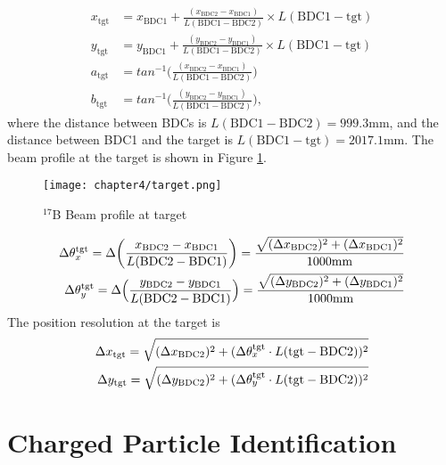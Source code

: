 \begin{align}
    x_{\text{tgt}} &= x_{\text{BDC1}} + \frac{(x_{\text{BDC2}} - x_{\text{BDC1}})}{L(\text{BDC1} - \text{BDC2})} \times L(\text{BDC1} - \text{tgt})\\
    y_{\text{tgt}} &= y_{\text{BDC1}} + \frac{(y_{\text{BDC2}} - y_{\text{BDC1}})}{L(\text{BDC1} - \text{BDC2})} \times L(\text{BDC1} - \text{tgt})\\
    a_{\text{tgt}} &= tan^{-1} \bigg( \frac{(x_{\text{BDC2}} - x_{\text{BDC1}})}{L(\text{BDC1} - \text{BDC2})} \bigg)\\
    b_{\text{tgt}} &= tan^{-1} \bigg( \frac{(y_{\text{BDC2}} - y_{\text{BDC1}})}{L(\text{BDC1} - \text{BDC2})} \bigg),
\end{align}
where the distance between BDCs is $L(\text{BDC1} - \text{BDC2}) = 999.3 $mm, and the distance between BDC1 and the target is $L(\text{BDC1} - \text{tgt}) = 2017.1$mm. The beam profile at the target is shown in Figure \ref{fig:beam_profile_tgt}.
\begin{figure}[h]
    \centering
    \texttt{[image: chapter4/target.png]}
    \caption{${}^{17}$B Beam profile at target}
    \label{fig:beam_profile_tgt}
\end{figure}


\begin{align}
    \Delta \theta_x^{\text{tgt}} = \Delta \bigg( \frac{x_{\text{BDC2}} - x_{\text{BDC1}}}{L(\text{BDC2} - \text{BDC1})} \bigg) 
    = \frac{\sqrt{(\Delta x_{\text{BDC2}})^2 + (\Delta x_{\text{BDC1}})^2}}{1000 \text{mm}} \\ \notag
    \Delta \theta^{\text{tgt}}_y = \Delta \Big( \frac{y_{\text{BDC2}} - y_{\text{BDC1}}}{L(\text{BDC2} - \text{BDC1})} \Big) 
    = \frac{\sqrt{(\Delta y_{\text{BDC2}})^2 + (\Delta y_{\text{BDC1}})^2}}{1000 \text{mm}}
\end{align}
The position resolution at the target is
\begin{align}
    \Delta x_{\text{tgt}} = \sqrt{(\Delta x_{\text{BDC2}})^2 + (\Delta \theta_x^{\text{tgt}} \cdot L(\text{tgt} - \text{BDC2}))^2} \\ \notag
    \Delta y_{\text{tgt}} = \sqrt{(\Delta y_{\text{BDC2}})^2 + (\Delta \theta_y^{\text{tgt}} \cdot L(\text{tgt} - \text{BDC2}))^2}
\end{align}

\clearpage

\section{Charged Particle Identification}

